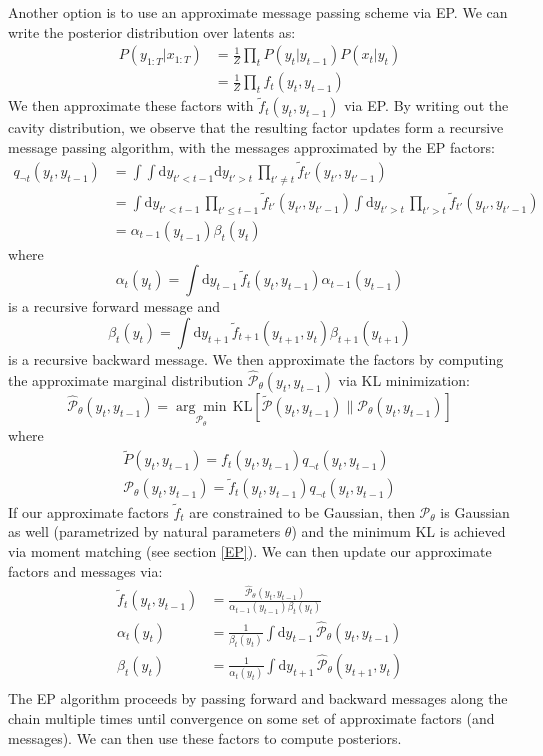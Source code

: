 \documentclass[a4paper]{article}
\begin{document}
Another option is to use an approximate message passing scheme via EP. We can write the posterior distribution over latents as:
\begin{align*}
P(y_{1:T}|x_{1:T}) &= \frac{1}{Z} \prod_t P(y_t|y_{t-1})P(x_t|y_t) \\
&= \frac{1}{Z} \prod_t f_t(y_t,y_{t-1})
\end{align*}
We then approximate these factors with $\tilde{f}_t(y_t,y_{t-1})$ via EP. By writing out the cavity distribution, we observe that the resulting factor updates form a recursive message passing algorithm, with the messages approximated by the EP factors:
\begin{align*}
q_{\neg t}(y_t,y_{t-1}) &= \int \int \textrm{d}y_{t' < t-1} \textrm{d}y_{t' > t}\, \prod_{t' \neq t} \tilde{f}_{t'}(y_{t'},y_{t'-1}) \\
&= \int\textrm{d}y_{t' < t-1}\, \prod_{t' \leq t-1} \tilde{f}_{t'}(y_{t'},y_{t'-1}) \int\textrm{d}y_{t' > t}\, \prod_{t' > t} \tilde{f}_{t'}(y_{t'},y_{t'-1}) \\
&= \alpha_{t-1}(y_{t-1}) \beta_t(y_t)
\end{align*}
where
\[ \alpha_t(y_t) = \int\textrm{d}y_{t-1}\, \tilde{f}_t(y_t,y_{t-1}) \alpha_{t-1}(y_{t-1}) \]
is a recursive forward message and 
\[ \beta_t(y_t) = \int\textrm{d}y_{t+1}\, \tilde{f}_{t+1}(y_{t+1},y_t) \beta_{t+1}(y_{t+1}) \]
is a recursive backward message. We then approximate the factors by computing the approximate marginal distribution $\hat{\mathcal{P}}_\theta(y_t,y_{t-1})$ via KL minimization:
\[ \hat{\mathcal{P}}_\theta(y_t,y_{t-1}) = \underset{\mathcal{P}_\theta}{\arg\min}\, \textrm{KL}\left[\tilde{\mathcal{P}}(y_t,y_{t-1}) \| \mathcal{P}_\theta(y_t,y_{t-1}) \right] \]
where 
\begin{gather*}
\tilde{P}(y_t,y_{t-1}) = f_t(y_t,y_{t-1})q_{\neg t}(y_t,y_{t-1}) \\
\mathcal{P}_\theta(y_t,y_{t-1}) = \tilde{f}_t(y_t,y_{t-1})q_{\neg t}(y_t,y_{t-1})
\end{gather*}
If our approximate factors $\tilde{f}_t$ are constrained to be Gaussian, then $\mathcal{P}_\theta$ is Gaussian as well (parametrized by natural parameters $\theta$) and the minimum KL is achieved via moment matching (see section \ref{EP}). We can then update our approximate factors and messages via:
\begin{align*}
\tilde{f}_t(y_t,y_{t-1}) &= \frac{\hat{\mathcal{P}}_\theta(y_t,y_{t-1})}{\alpha_{t-1}(y_{t-1}) \beta_t(y_t)} \\
\alpha_t(y_t) &= \frac{1}{\beta_t(y_t)} \int\textrm{d}y_{t-1}\, \hat{\mathcal{P}}_\theta(y_t,y_{t-1})\\
\beta_t(y_t) &= \frac{1}{\alpha_t(y_t)} \int\textrm{d}y_{t+1}\, \hat{\mathcal{P}}_\theta(y_{t+1},y_t)\\
\end{align*}
The EP algorithm proceeds by passing forward and backward messages along the chain multiple times until convergence on some set of approximate factors (and messages). We can then use these factors to compute posteriors.
\end{document}
